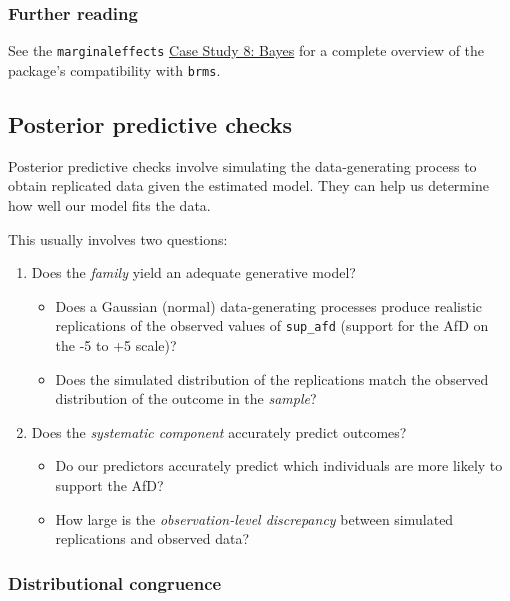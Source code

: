 \documentclass[
  11pt,
]{article}
\providecommand{\tightlist}{%
  \setlength{\itemsep}{0pt}\setlength{\parskip}{0pt}}
\begin{document}
\hypertarget{further-reading}{%
\subsubsection{Further reading}\label{further-reading}}

See the \texttt{marginaleffects} \href{https://marginaleffects.com/articles/brms.html}{Case Study 8: Bayes} for a complete overview of the package's compatibility with \texttt{brms}.

\hypertarget{posterior-predictive-checks}{%
\subsection{Posterior predictive checks}\label{posterior-predictive-checks}}

Posterior predictive checks involve simulating the data-generating process to
obtain replicated data given the estimated model. They can help us determine
how well our model fits the data.

This usually involves two questions:

\begin{enumerate}
\def\labelenumi{\arabic{enumi}.}
\tightlist
\item
  Does the \emph{family} yield an adequate generative model?

  \begin{itemize}
  \tightlist
  \item
    Does a Gaussian (normal) data-generating processes produce realistic replications of the observed values of \texttt{sup\_afd} (support for the AfD on the -5 to +5 scale)?
  \item
    Does the simulated distribution of the replications match the observed distribution of the outcome in the \emph{sample}?
  \end{itemize}
\item
  Does the \emph{systematic component} accurately predict outcomes?

  \begin{itemize}
  \tightlist
  \item
    Do our predictors accurately predict which individuals are more likely to support the AfD?
  \item
    How large is the \emph{observation-level discrepancy} between simulated replications and observed data?
  \end{itemize}
\end{enumerate}

\hypertarget{distributional-congruence}{%
\subsubsection{Distributional congruence}\label{distributional-congruence}}
\end{document}
